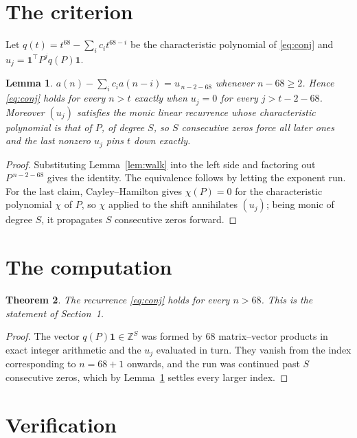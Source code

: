 \documentclass[11pt,a4paper]{article}
\theoremstyle{plain}
\newtheorem{theorem}{Theorem}
\newtheorem{lemma}[theorem]{Lemma}
\theoremstyle{definition}
\begin{document}
\section{The criterion}

Let $q(t)=t^{68}-\sum_i c_i t^{68-i}$ be the characteristic polynomial of
\eqref{eq:conj} and $u_j=\mathbf{1}^{\!\top}P^{j}q(P)\mathbf{1}$.

\begin{lemma}\label{lem:crit}
$a(n)-\sum_i c_i a(n-i)=u_{\,n-2-68}$ whenever $n-68\ge2$. Hence
\eqref{eq:conj} holds for every $n>t$ exactly when $u_j=0$ for every
$j>t-2-68$. Moreover $(u_j)$ satisfies the monic linear recurrence whose
characteristic polynomial is that of $P$, of degree $S$, so $S$ consecutive zeros force all
later ones and the last nonzero $u_j$ pins $t$ down exactly.
\end{lemma}

\begin{proof}
Substituting Lemma~\ref{lem:walk} into the left side and factoring out
$P^{\,n-2-68}$ gives the identity. The equivalence follows by letting the exponent
run. For the last claim, Cayley--Hamilton gives $\chi(P)=0$ for the characteristic
polynomial $\chi$ of $P$, so $\chi$ applied to the shift annihilates $(u_j)$; being monic of
degree $S$, it propagates $S$ consecutive zeros forward.
\end{proof}

\section{The computation}

\begin{theorem}
The recurrence \eqref{eq:conj} holds for every $n>68$. This is the statement of
Section~1.
\end{theorem}

\begin{proof}
The vector $q(P)\mathbf{1}\in\mathbb{Z}^{S}$ was formed by $68$ matrix--vector
products in exact integer arithmetic and the $u_j$ evaluated in turn. They vanish from the
index corresponding to $n=68+1$ onwards, and the run was continued past $S$ consecutive
zeros, which by Lemma~\ref{lem:crit} settles every larger index.
\end{proof}

\section{Verification}
\end{document}
